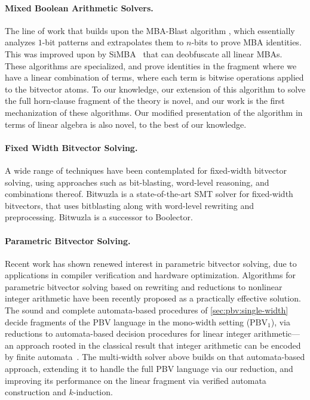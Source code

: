 \paragraph{Mixed Boolean Arithmetic Solvers.}
The line of work that builds upon the MBA-Blast algorithm \cite{liu2021mba},
which essentially analyzes $1$-bit patterns and extrapolates them to $n$-bits to prove MBA identities.
This was improved upon by SiMBA~\cite{reichenwallner2022efficient} that can deobfuscate all linear MBAs.
These algorithms are specialized, and prove identities in the fragment where we have a linear combination of terms,
where each term is bitwise operations applied to the bitvector atoms.
To our knowledge, our extension of this algorithm to solve the full horn-clause fragment of the theory is novel,
and our work is the first mechanization of these algorithms.
Our modified presentation of the algorithm in terms of linear algebra is also novel, to the best of our knowledge.
\paragraph{Fixed Width Bitvector Solving.}
A wide range of techniques have been contemplated for fixed-width bitvector solving,
using approaches such as bit-blasting, word-level reasoning, and combinations thereof.
Bitwuzla \cite{niemetz2023bitwuzla} is a state-of-the-art SMT solver for fixed-width bitvectors, that uses bitblasting
along with word-level rewriting and preprocessing. Bitwuzla is a successor to Boolector\cite{brummayer2009boolector}.

\paragraph{Parametric Bitvector Solving.}
Recent work has shown renewed interest in parametric bitvector solving,
due to applications in compiler verification and hardware optimization.
Algorithms for parametric bitvector solving based on rewriting and reductions to nonlinear integer arithmetic \cite{bit-precise-parametric-bv} have been recently proposed
as a practically effective solution.
The sound and complete automata-based procedures of \cref{sec:pbv:single-width}
decide fragments of the PBV language in the mono-width setting ($\text{PBV}_1$), via reductions
to automata-based decision procedures for linear integer arithmetic---an approach
rooted in the classical result that integer arithmetic can be encoded by finite
automata~\citep{Buchi-presburger}. The multi-width solver above builds on that
automata-based approach, extending it to handle the full PBV language via our
reduction, and improving its performance on the linear fragment via verified
automata construction and $k$-induction.

